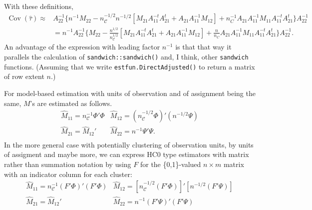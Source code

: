 \documentclass{article}
\begin{document}
With these definitions,
\begin{align}
  \operatorname{Cov}(\hat\tau) \approx& A_{22}^{-1}\{n^{-1} M_{22} -
                                 n_{\mathcal{C}}^{-1/2}n^{-1/2}[M_{21}A_{11}^{-t}A_{21}^t
                                 + A_{21}A_{11}^{-1}M_{12}] +
                                 n_C^{-1}A_{21}A_{11}^{-1}M_{11}A_{11}^{-t}A_{21}^{t}\}A_{22}^{-1}\nonumber
  \\
                               &= n^{-1}A_{22}^{-1}\{
                                 M_{22} -
                                 \frac{n^{1/2}}{n_{\mathcal{C}}^{1/2}}[M_{21}A_{11}^{-t}A_{21}^t
                                 + A_{21}A_{11}^{-1}M_{12}] +
                                 \frac{n}{n_C}A_{21}A_{11}^{-1}M_{11}A_{11}^{-t}A_{21}^{t}\}A_{22}^{-1}
                                . \label{eq:6}
\end{align}
An advantage of the expression with leading factor $n^{-1}$ is that
that way it parallels the calculation of
\texttt{sandwich::sandwich()} and, I think, other \texttt{sandwich}
functions. (Assuming that we write
\texttt{estfun.DirectAdjusted()}  to return a matrix of row extent
$n$.) 

For model-based estimation with units of observation and of assignment being
the same, $M$'s are estimated as follows. 
\begin{equation}\label{eq:7}
  \begin{array}{cc}
  \hat{M}_{11} =n_{\mathcal{C}}^{-1} \Phi'\Phi & \hat{M}_{12} = (n_{\mathcal{C}}^{-1/2}\Phi)'(n^{-1/2} \Psi)\\
    \hat{M}_{21} =\hat{M}_{12}' & \hat{M}_{22}= n^{-1}\Psi'\Psi.\\
    \end{array} 
  \end{equation}
  In the more general case with potentially clustering of observation
units, by units of assigment and maybe more, we can express HC0
type estimators with matrix rather than summation notation by using
$F$ for the \{0,1\}-valued $n \times m$ matrix with an indicator
column for each cluster:
\begin{equation} \label{eq:8}
  \begin{array}{cc}
  \hat{M}_{11} =n_{\mathcal{C}}^{-1} (F'\Phi)'(F'\Phi) & \hat{M}_{12} = [n_{\mathcal{C}}^{-1/2} (F'\Phi)]'[n^{-1/2} (F'\Psi)]\\
    \hat{M}_{21} =\hat{M}_{12}' & \hat{M}_{22}= n^{-1}(F'\Psi)'(F'\Psi)\\
    \end{array}
  \end{equation}
  
\end{document}
